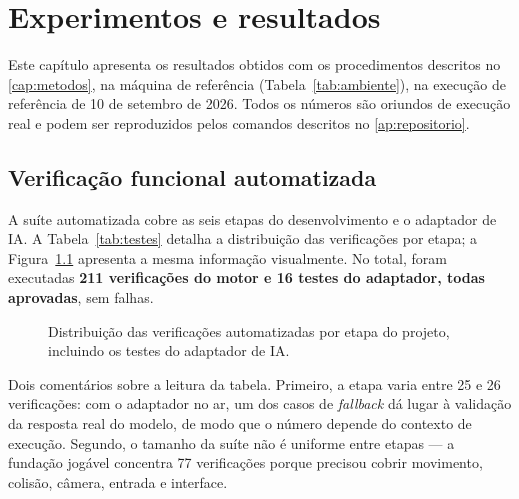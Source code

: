 \chapter{Experimentos e resultados}
\label{cap:resultados}

Este capítulo apresenta os resultados obtidos com os procedimentos descritos
no \autoref{cap:metodos}, na máquina de referência
(Tabela~\ref{tab:ambiente}), na execução de referência de 10 de setembro de
2026. Todos os números são oriundos de execução real e podem ser reproduzidos
pelos comandos descritos no \autoref{ap:repositorio}.

\section{Verificação funcional automatizada}
\label{sec:res_testes}

A suíte automatizada cobre as seis etapas do desenvolvimento e o adaptador de
IA. A Tabela~\ref{tab:testes} detalha a distribuição das verificações por
etapa; a Figura~\ref{fig:verificacoes} apresenta a mesma informação
visualmente. No total, foram executadas \textbf{211 verificações do motor e 16
testes do adaptador, todas aprovadas}, sem falhas.



\begin{figure}[htbp]
\centering
{}
\caption{Distribuição das verificações automatizadas por etapa do projeto, incluindo os testes do adaptador de IA.}
\label{fig:verificacoes}
\par\vspace{2pt}{\footnotesize Fonte: elaborado pelo autor (2026), a partir da execução da suíte.}
\end{figure}

Dois comentários sobre a leitura da tabela. Primeiro, a etapa  varia
entre 25 e 26 verificações: com o adaptador no ar, um dos casos de
\emph{fallback} dá lugar à validação da resposta real do modelo, de modo que
o número depende do contexto de execução. Segundo, o tamanho da suíte não é
uniforme entre etapas --- a fundação jogável concentra 77 verificações porque
precisou cobrir movimento, colisão, câmera, entrada e interface.

